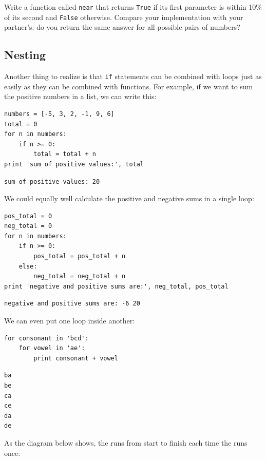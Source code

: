 \documentclass{book}
\begin{document}
\begin{challenge}
  Write a function called \texttt{near} that returns \texttt{True} if
  its first parameter is within 10\% of its second and \texttt{False}
  otherwise. Compare your implementation with your partner's: do you
  return the same answer for all possible pairs of numbers?
\end{challenge}

\subsection{Nesting}

Another thing to realize is that \texttt{if} statements can be combined
with loops just as easily as they can be combined with functions. For
example, if we want to sum the positive numbers in a list, we can write
this:

\begin{verbatim}
numbers = [-5, 3, 2, -1, 9, 6]
total = 0
for n in numbers:
    if n >= 0:
        total = total + n
print 'sum of positive values:', total
\end{verbatim}

\begin{verbatim}
sum of positive values: 20
\end{verbatim}

We could equally well calculate the positive and negative sums in a
single loop:

\begin{verbatim}
pos_total = 0
neg_total = 0
for n in numbers:
    if n >= 0:
        pos_total = pos_total + n
    else:
        neg_total = neg_total + n
print 'negative and positive sums are:', neg_total, pos_total
\end{verbatim}

\begin{verbatim}
negative and positive sums are: -6 20
\end{verbatim}

We can even put one loop inside another:

\begin{verbatim}
for consonant in 'bcd':
    for vowel in 'ae':
        print consonant + vowel
\end{verbatim}

\begin{verbatim}
ba
be
ca
ce
da
de
\end{verbatim}

As the diagram below shows, the  runs
from start to finish each time the 
runs once:
\end{document}
